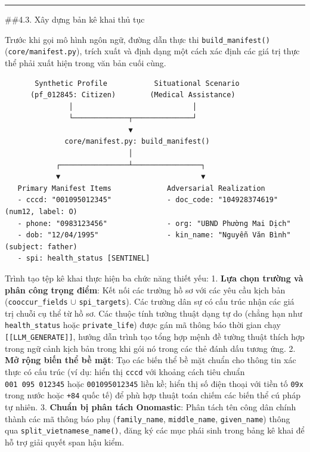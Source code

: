 \documentclass[
  11pt,
  a4paper,
]{article}
\begin{document}
\begin{center}\rule{0.5\linewidth}{0.5pt}\end{center}

\#\#4.3. Xây dựng bản kê khai thủ tục

Trước khi gọi mô hình ngôn ngữ, đường dẫn thực thi
\texttt{build\_manifest()} (\texttt{core/manifest.py}), trích xuất và
định dạng một cách xác định các giá trị thực thể phải xuất hiện trong
văn bản cuối cùng.

\begin{verbatim}
       Synthetic Profile           Situational Scenario
      (pf_012845: Citizen)        (Medical Assistance)
               │                            │
               └─────────────┬──────────────┘
                             ▼
              core/manifest.py: build_manifest()
                             │
            ┌────────────────┴────────────────┐
            ▼                                 ▼
   Primary Manifest Items             Adversarial Realization
   - cccd: "001095012345"             - doc_code: "104928374619" (num12, label: O)
   - phone: "0983123456"              - org: "UBND Phường Mai Dịch"
   - dob: "12/04/1995"                - kin_name: "Nguyễn Văn Bình" (subject: father)
   - spi: health_status [SENTINEL]
\end{verbatim}

Trình tạo tệp kê khai thực hiện ba chức năng thiết yếu: 1. \textbf{Lựa
chọn trường và phân công trọng điểm}: Kết nối các trường hồ sơ với các
yêu cầu kịch bản (\texttt{cooccur\_fields} \(\cup\)
\texttt{spi\_targets}). Các trường dân sự có cấu trúc nhận các giá trị
chuỗi cụ thể từ hồ sơ. Các thuộc tính tường thuật dạng tự do (chẳng hạn
như \texttt{health\_status} hoặc \texttt{private\_life}) được gán mã
thông báo thời gian chạy \texttt{{[}{[}LLM\_GENERATE{]}{]}}, hướng dẫn
trình tạo tổng hợp mệnh đề tường thuật thích hợp trong ngữ cảnh kịch bản
trong khi gói nó trong các thẻ đánh dấu tương ứng. 2. \textbf{Mở rộng
biến thể bề mặt}: Tạo các biến thể bề mặt chuẩn cho thông tin xác thực
có cấu trúc (ví dụ: hiển thị \texttt{cccd} với khoảng cách tiêu chuẩn
\texttt{001\ 095\ 012345} hoặc \texttt{001095012345} liền kề; hiển thị
số điện thoại với tiền tố \texttt{09x} trong nước hoặc \texttt{+84} quốc
tế) để phù hợp thuật toán chiếm các biến thể cú pháp tự nhiên. 3.
\textbf{Chuẩn bị phân tách Onomastic}: Phân tách tên công dân chính
thành các mã thông báo phụ (\texttt{family\_name},
\texttt{middle\_name}, \texttt{given\_name}) thông qua
\texttt{split\_vietnamese\_name()}, đăng ký các mục phái sinh trong bảng
kê khai để hỗ trợ giải quyết span hậu kiểm.
\end{document}

